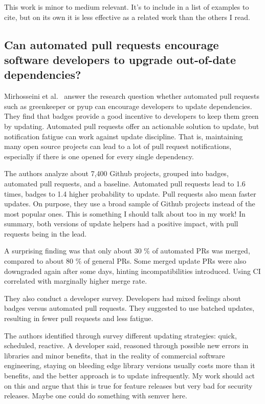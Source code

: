 This work is minor to medium relevant.
It's to include in a list of examples to cite, but on its own it is less effective as a related work than the others
I read.



\subsection{Can automated pull requests encourage software developers to upgrade out-of-date dependencies?}
\label{subsec:can-automated-pull-requests-encourage-software-developers-to-upgrade-out-of-date-dependencies?}

Mirhosseini et al.~\cite{mirhosseini2017} answer the research question whether automated pull requests such as greenkeeper
or pyup can encourage developers to update dependencies.
They find that badges provide a good incentive to developers to keep them green by updating.
Automated pull requests offer an actionable solution to update, but notification fatigue can work against update
discipline.
That is, maintaining many open source projects can lead to a lot of pull request notifications, especially if there is
one opened for every single dependency.

The authors analyze about 7,400 Github projects, grouped into badges, automated pull requests, and a baseline.
Automated pull requests lead to 1.6 times, badges to 1.4 higher probability to update.
Pull requests also mean faster updates.
On purpose, they use a broad sample of Github projects instead of the most popular ones.
This is something I should talk about too in my work!
In summary, both versions of update helpers had a positive impact, with pull requests being in the lead.

A surprising finding was that only about 30 \% of automated PRs was merged, compared to about 80 \% of general PRs.
Some merged update PRs were also downgraded again after some days, hinting incompatibilities introduced.
Using CI correlated with marginally higher merge rate.

They also conduct a developer survey.
Developers had mixed feelings about badges versus automated pull requests.
They suggested to use batched updates, resulting in fewer pull requests and less fatigue.

The authors identified through survey different updating strategies: quick, scheduled, reactive.
A developer said, reasoned through possible new errors in libraries and minor benefits, that in the reality of commercial
software engineering, staying on bleeding edge library versions usually costs more than it benefits, and the better
approach is to update infrequently.
My work should act on this and argue that this is true for feature releases but very bad for security releases.
Maybe one could do something with semver here.

